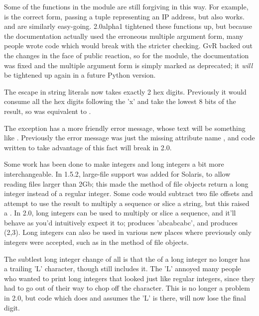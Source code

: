\documentclass{howto}
\begin{document}
Some of the functions in the  module are still
forgiving in this way.  For example,  is the correct form, passing a tuple representing
an IP address, but  also
works.  and  are
similarly easy-going.  2.0alpha1 tightened these functions up, but
because the documentation actually used the erroneous multiple
argument form, many people wrote code which would break with the
stricter checking.  GvR backed out the changes in the face of public
reaction, so for the  module, the documentation was
fixed and the multiple argument form is simply marked as deprecated;
it \emph{will} be tightened up again in a future Python version.

The  escape in string literals now takes exactly 2 hex
digits.  Previously it would consume all the hex digits following the
'x' and take the lowest 8 bits of the result, so  was
equivalent to .

The  exception has a more friendly error message,
whose text will be something like .
Previously the error message was just the missing attribute name , and 
code written to take advantage of this fact will break in 2.0.

Some work has been done to make integers and long integers a bit more
interchangeable.  In 1.5.2, large-file support was added for Solaris,
to allow reading files larger than 2Gb; this made the 
method of file objects return a long integer instead of a regular
integer.  Some code would subtract two file offsets and attempt to use
the result to multiply a sequence or slice a string, but this raised a
.  In 2.0, long integers can be used to multiply
or slice a sequence, and it'll behave as you'd intuitively expect it
to;  produces 'abcabcabc', and  produces (2,3). Long integers can also be used in
various new places where previously only integers were accepted, such
as in the  method of file objects.

The subtlest long integer change of all is that the 
of a long integer no longer has a trailing 'L' character, though
 still includes it.  The 'L' annoyed many people who
wanted to print long integers that looked just like regular integers,
since they had to go out of their way to chop off the character.  This
is no longer a problem in 2.0, but code which does  and assumes the 'L' is there, will now lose
the final digit.
\end{document}
